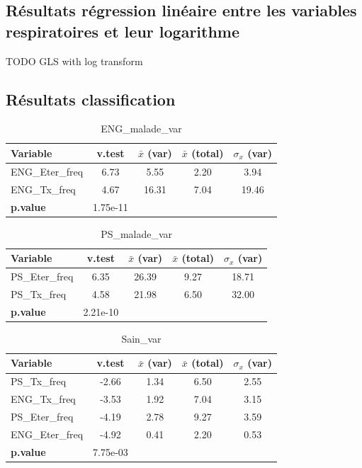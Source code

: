 \documentclass{article}
\begin{document}
\subsection{Résultats régression linéaire entre les variables respiratoires et leur logarithme}\label{annexe:reg_lin_log}
TODO GLS with log transform 

\subsection{Résultats classification}\label{annexe:clusters}

\begin{table}[ht]
    \centering
    \begin{tabular}{lcccc}
        \toprule
        \textbf{Variable} & \textbf{v.test} & \textbf{$\bar{x}$ (var)} & \textbf{$\bar{x}$ (total)} & \textbf{$\sigma_x$ (var)} \\
        \midrule
        ENG\_Eter\_freq & 6.73 & 5.55 & 2.20 & 3.94 \\
        ENG\_Tx\_freq  & 4.67 & 16.31 & 7.04 & 19.46 \\
        \midrule
        \textbf{p.value} & 1.75e-11 & & & \\
        \bottomrule
    \end{tabular}
    \caption{ENG\_malade\_var}
\end{table}
    
\begin{table}[ht]
    \centering
        \begin{tabular}{lcccc}
        \toprule
        \textbf{Variable} & \textbf{v.test} & \textbf{$\bar{x}$ (var)} & \textbf{$\bar{x}$ (total)} & \textbf{$\sigma_x$ (var)} \\
        \midrule
        PS\_Eter\_freq & 6.35 & 26.39 & 9.27 & 18.71 \\
        PS\_Tx\_freq  & 4.58 & 21.98 & 6.50 & 32.00 \\
        \midrule
        \textbf{p.value} & 2.21e-10 & & & \\
        \bottomrule
    \end{tabular}
    \caption{PS\_malade\_var}
\end{table}
    
\begin{table}[ht]
    \centering
    \begin{tabular}{lcccc}
        \toprule
        \textbf{Variable} & \textbf{v.test} & \textbf{$\bar{x}$ (var)} & \textbf{$\bar{x}$ (total)} & \textbf{$\sigma_x$ (var)} \\
        \midrule
        PS\_Tx\_freq    & -2.66 & 1.34 & 6.50 & 2.55 \\
        ENG\_Tx\_freq   & -3.53 & 1.92 & 7.04 & 3.15 \\
        PS\_Eter\_freq  & -4.19 & 2.78 & 9.27 & 3.59 \\
        ENG\_Eter\_freq & -4.92 & 0.41 & 2.20 & 0.53 \\
        \midrule
        \textbf{p.value} & 7.75e-03 & & & \\
        \bottomrule
    \end{tabular}
    \caption{Sain\_var}
\end{table}
\end{document}

